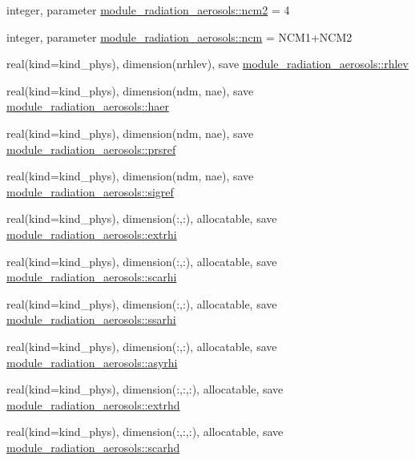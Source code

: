 \begin{DoxyCompactItemize}
\item 
integer, parameter \hyperlink{group__module__radiation__aerosols_ga61dbcce5b0bb02dd31d4a37983887a7b}{module\+\_\+radiation\+\_\+aerosols\+::ncm2} = 4
\item 
integer, parameter \hyperlink{group__module__radiation__aerosols_gab46e61a4a386794a5e9e97d8ef7d98a5}{module\+\_\+radiation\+\_\+aerosols\+::ncm} = N\+C\+M1+N\+C\+M2
\item 
real(kind=kind\+\_\+phys), dimension(nrhlev), save \hyperlink{group__module__radiation__aerosols_ga6aa3218393ea05cab77ab7867cfeab90}{module\+\_\+radiation\+\_\+aerosols\+::rhlev}
\item 
real(kind=kind\+\_\+phys), dimension(ndm, nae), save \hyperlink{group__module__radiation__aerosols_ga8ce24a58afb33dd372995bf5aaf95be9}{module\+\_\+radiation\+\_\+aerosols\+::haer}
\item 
real(kind=kind\+\_\+phys), dimension(ndm, nae), save \hyperlink{group__module__radiation__aerosols_ga274fad1b6e00e66375882e32494d61c0}{module\+\_\+radiation\+\_\+aerosols\+::prsref}
\item 
real(kind=kind\+\_\+phys), dimension(ndm, nae), save \hyperlink{group__module__radiation__aerosols_ga227ac7558dc0f33c34c34544771617ec}{module\+\_\+radiation\+\_\+aerosols\+::sigref}
\item 
real(kind=kind\+\_\+phys), dimension(\+:,\+:), allocatable, save \hyperlink{group__module__radiation__aerosols_ga40447f925f01790155c4d98ff8b0c04d}{module\+\_\+radiation\+\_\+aerosols\+::extrhi}
\item 
real(kind=kind\+\_\+phys), dimension(\+:,\+:), allocatable, save \hyperlink{group__module__radiation__aerosols_ga439929b1de549fadecc8537bae13e9de}{module\+\_\+radiation\+\_\+aerosols\+::scarhi}
\item 
real(kind=kind\+\_\+phys), dimension(\+:,\+:), allocatable, save \hyperlink{group__module__radiation__aerosols_gae4e1ead8bb34371c2d9f1b428846c10c}{module\+\_\+radiation\+\_\+aerosols\+::ssarhi}
\item 
real(kind=kind\+\_\+phys), dimension(\+:,\+:), allocatable, save \hyperlink{group__module__radiation__aerosols_gaac2d735c117dd7d1e72264e611764f79}{module\+\_\+radiation\+\_\+aerosols\+::asyrhi}
\item 
real(kind=kind\+\_\+phys), dimension(\+:,\+:,\+:), allocatable, save \hyperlink{group__module__radiation__aerosols_ga1c69f7b8ff0c98252e94def83dabfed4}{module\+\_\+radiation\+\_\+aerosols\+::extrhd}
\item 
real(kind=kind\+\_\+phys), dimension(\+:,\+:,\+:), allocatable, save \hyperlink{group__module__radiation__aerosols_ga859ba893a7b0b727ce02f3f29906a0a6}{module\+\_\+radiation\+\_\+aerosols\+::scarhd}

\end{DoxyCompactItemize}
